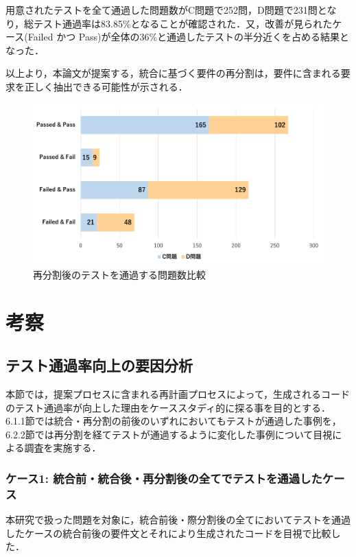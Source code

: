 \documentclass[submit,techrep,noauthor]{ipsj}
\begin{document}
用意されたテストを全て通過した問題数がC問題で252問，D問題で231問となり，総テスト通過率は83.85\%となることが確認された．又，改善が見られたケース(Failed かつ Pass)が全体の36\%と通過したテストの半分近くを占める結果となった．

以上より，本論文が提案する，統合に基づく要件の再分割は，要件に含まれる要求を正しく抽出できる可能性が示される．

\begin{figure}[t]
    \centering
    \includegraphics[width=1.0\linewidth]{./Toyoshima_fig/RQ3_1.pdf}
    \caption{再分割後のテストを通過する問題数比較}
    \label{rq3_1}
\end{figure}

\section{考察}
\label{sec:discussion}
\subsection{テスト通過率向上の要因分析}
本節では，提案プロセスに含まれる再計画プロセスによって，生成されるコードのテスト通過率が向上した理由をケーススタディ的に探る事を目的とする．
6.1.1節では統合・再分割の前後のいずれにおいてもテストが通過した事例を，6.2.2節では再分割を経てテストが通過するように変化した事例について目視による調査を実施する．

\subsubsection{ケース1: 統合前・統合後・再分割後の全てでテストを通過したケース}
本研究で扱った問題を対象に，統合前後・際分割後の全てにおいてテストを通過したケースの統合前後の要件文とそれにより生成されたコードを目視で比較した．
\end{document}
